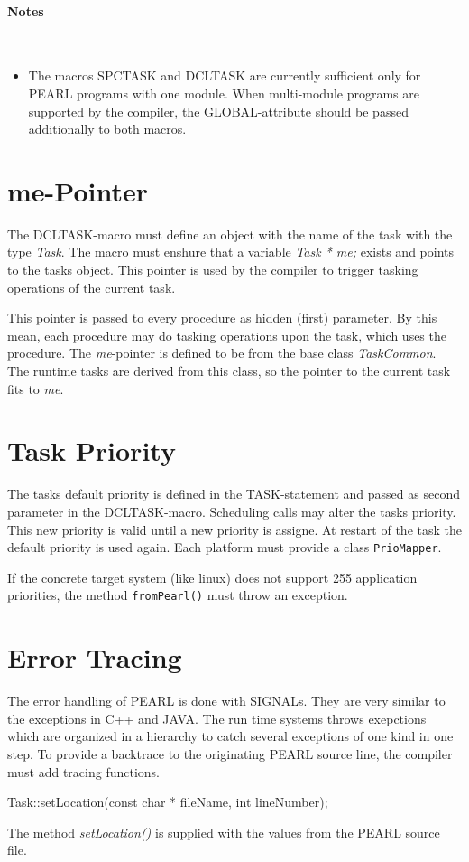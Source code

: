 \paragraph{Notes}\ \\
\begin{itemize}
\item The macros SPCTASK and DCLTASK are currently sufficient only for
    PEARL programs with one module. When multi-module programs
    are supported by the compiler, the GLOBAL-attribute should be 
    passed additionally to both macros.
\end{itemize}

\section{me-Pointer}
The DCLTASK-macro must define an object with the name of the
task with the type {\em Task}.
The macro must enshure that a variable  {\em Task * me;} exists
and points to the tasks object. This pointer is used
by the compiler to trigger tasking operations of the current
task.

This pointer is passed to every procedure as hidden (first) parameter.
By this mean, each procedure may do tasking operations upon the
task, which uses the procedure.
The {\em me}-pointer is defined to be from the base class  {\em TaskCommon}. 
The runtime tasks are derived from this class, so the pointer to the current 
task fits to {\em me}.

\section{Task Priority}
The tasks default priority is defined in the TASK-statement and passed
as second parameter in the DCLTASK-macro.
Scheduling calls may alter the tasks priority. This new priority is valid 
until a new priority is assigne. At restart of the task the default 
priority is used again. Each platform must provide a class \verb|PrioMapper|.

If the concrete target system (like linux) does not support 255 
 application priorities, the method \verb|fromPearl()| must throw
an exception.


\section{Error Tracing}
The error handling of PEARL is done with SIGNALs.
They are very similar to the exceptions in C++ and JAVA. 
The run time systems throws exepctions which are organized in a
hierarchy to catch several exceptions of one kind in one step.
To provide a backtrace to the originating PEARL source line, the compiler 
must add tracing functions.
\begin{CppCode}
Task::setLocation(const char * fileName, int lineNumber);
\end{CppCode}
The method {\em setLocation()} is supplied with the values from
the PEARL source file.

